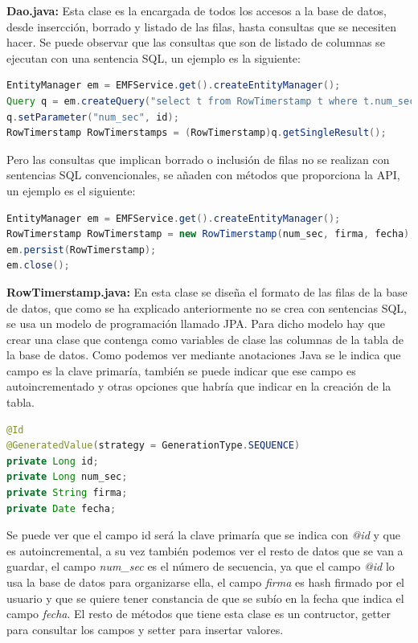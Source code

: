 \begin{description}
\item \textbf{Dao.java:} Esta clase es la encargada de todos los accesos a la base de datos, desde insercción, borrado y listado de las filas, hasta consultas que se necesiten hacer. Se puede observar que las consultas que son de listado de columnas se ejecutan con una sentencia SQL, un ejemplo es la siguiente:
\begin{lstlisting}[language=Java]
EntityManager em = EMFService.get().createEntityManager();
Query q = em.createQuery("select t from RowTimerstamp t where t.num_sec = :num_sec");
q.setParameter("num_sec", id);
RowTimerstamp RowTimerstamps = (RowTimerstamp)q.getSingleResult();
\end{lstlisting}

Pero las consultas que implican borrado o inclusión de filas no se realizan con sentencias SQL convencionales, se añaden con métodos que proporciona la API, un ejemplo es el siguiente:
\begin{lstlisting}[language=Java]
EntityManager em = EMFService.get().createEntityManager();
RowTimerstamp RowTimerstamp = new RowTimerstamp(num_sec, firma, fecha);
em.persist(RowTimerstamp);
em.close();
\end{lstlisting}

\item \textbf{RowTimerstamp.java:} En esta clase se diseña el formato de las filas de la base de datos, que como se ha explicado anteriormente no se crea con sentencias SQL, se usa un modelo de programación llamado JPA. Para dicho modelo hay que crear una clase que contenga como variables de clase las columnas de la tabla de la base de datos. Como podemos ver mediante anotaciones Java se le indica que campo es la clave primaría, también se puede indicar que ese campo es autoincrementado y otras opciones que habría que indicar en la creación de la tabla.   

\begin{lstlisting}[language=Java]
@Id
@GeneratedValue(strategy = GenerationType.SEQUENCE)
private Long id;
private Long num_sec;
private String firma;
private Date fecha;
\end{lstlisting}

Se puede ver que el campo id será la clave primaría que se indica con \textit{@id} y que es autoincremental, a su vez también podemos ver el resto de datos que se van a guardar, el campo \textit{num\_sec} es el número de secuencia, ya que el campo \textit{@id} lo usa la base de datos para organizarse ella, el campo \textit{firma} es hash firmado por el usuario y que se quiere tener constancia de que se subío en la fecha que indica el campo \textit{fecha}.
El resto de métodos que tiene esta clase es un contructor, getter para consultar los campos y setter para insertar valores.


\end{description}
